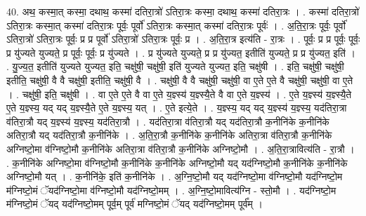 \documentclass[17pt]{extarticle}
\begin{document}
40. अथ॒ कस्मा॒त् कस्मा॒ दथाथ॒ कस्मा॑ दतिरा॒त्रो॑ ऽतिरा॒त्रः कस्मा॒ दथाथ॒ कस्मा॑ दतिरा॒त्रः । . कस्मा॑ दतिरा॒त्रो॑ ऽतिरा॒त्रः कस्मा॒त् कस्मा॑ दतिरा॒त्रः पूर्वः॒ पूर्वो॑ ऽतिरा॒त्रः कस्मा॒त् कस्मा॑ दतिरा॒त्रः पूर्वः॑ । . अ॒ति॒रा॒त्रः पूर्वः॒ पूर्वो॑ ऽतिरा॒त्रो॑ ऽतिरा॒त्रः पूर्वः॒ प्र प्र पूर्वो॑ ऽतिरा॒त्रो॑ ऽतिरा॒त्रः पूर्वः॒ प्र । . अ॒ति॒रा॒त्र इत्य॑ति - रा॒त्रः । . पूर्वः॒ प्र प्र पूर्वः॒ पूर्वः॒ प्र यु॑ज्यते युज्यते॒ प्र पूर्वः॒ पूर्वः॒ प्र यु॑ज्यते । . प्र यु॑ज्यते युज्यते॒ प्र प्र यु॑ज्यत॒ इतीति॑ युज्यते॒ प्र प्र यु॑ज्यत॒ इति॑ । . यु॒ज्य॒त॒ इतीति॑ युज्यते युज्यत॒ इति॒ चक्षु॑षी॒ चक्षु॑षी॒ इति॑ युज्यते युज्यत॒ इति॒ चक्षु॑षी । . इति॒ चक्षु॑षी॒ चक्षु॑षी॒ इतीति॒ चक्षु॑षी॒ वै वै चक्षु॑षी॒ इतीति॒ चक्षु॑षी॒ वै । . चक्षु॑षी॒ वै वै चक्षु॑षी॒ चक्षु॑षी॒ वा ए॒ते ए॒ते वै चक्षु॑षी॒ चक्षु॑षी॒ वा ए॒ते । . चक्षु॑षी॒ इति॒ चक्षु॑षी । . वा ए॒ते ए॒ते वै वा ए॒ते य॒ज्ञ्स्य॑ य॒ज्ञ्स्यै॒ते वै वा ए॒ते य॒ज्ञ्स्य॑ । . ए॒ते य॒ज्ञ्स्य॑ य॒ज्ञ्स्यै॒ते ए॒ते य॒ज्ञ्स्य॒ यद् यद् य॒ज्ञ्स्यै॒ते ए॒ते य॒ज्ञ्स्य॒ यत् । . ए॒ते इत्ये॒ते । . य॒ज्ञ्स्य॒ यद् यद् य॒ज्ञ्स्य॑ य॒ज्ञ्स्य॒ यद॑तिरा॒त्रा व॑तिरा॒त्रौ यद् य॒ज्ञ्स्य॑ य॒ज्ञ्स्य॒ यद॑तिरा॒त्रौ । . यद॑तिरा॒त्रा व॑तिरा॒त्रौ यद् यद॑तिरा॒त्रौ क॒नीनि॑के क॒नीनि॑के अतिरा॒त्रौ यद् यद॑तिरा॒त्रौ क॒नीनि॑के । . अ॒ति॒रा॒त्रौ क॒नीनि॑के क॒नीनि॑के अतिरा॒त्रा व॑तिरा॒त्रौ क॒नीनि॑के अग्निष्टो॒मा व॑ग्निष्टो॒मौ क॒नीनि॑के अतिरा॒त्रा व॑तिरा॒त्रौ क॒नीनि॑के अग्निष्टो॒मौ । . अ॒ति॒रा॒त्रावित्य॑ति - रा॒त्रौ । . क॒नीनि॑के अग्निष्टो॒मा व॑ग्निष्टो॒मौ क॒नीनि॑के क॒नीनि॑के अग्निष्टो॒मौ यद् यद॑ग्निष्टो॒मौ क॒नीनि॑के क॒नीनि॑के अग्निष्टो॒मौ यत् । . क॒नीनि॑के॒ इति॑ क॒नीनि॑के । . अ॒ग्नि॒ष्टो॒मौ यद् यद॑ग्निष्टो॒मा व॑ग्निष्टो॒मौ यद॑ग्निष्टो॒म म॑ग्निष्टो॒मं ॅयद॑ग्निष्टो॒मा व॑ग्निष्टो॒मौ यद॑ग्निष्टो॒मम् । . अ॒ग्नि॒ष्टो॒मावित्य॑ग्नि - स्तो॒मौ । . यद॑ग्निष्टो॒म म॑ग्निष्टो॒मं ॅयद् यद॑ग्निष्टो॒मम् पूर्व॒म् पूर्व॑ मग्निष्टो॒मं ॅयद् यद॑ग्निष्टो॒मम् पूर्व᳚म् । \newline
\pagebreak
{}
\end{document}
